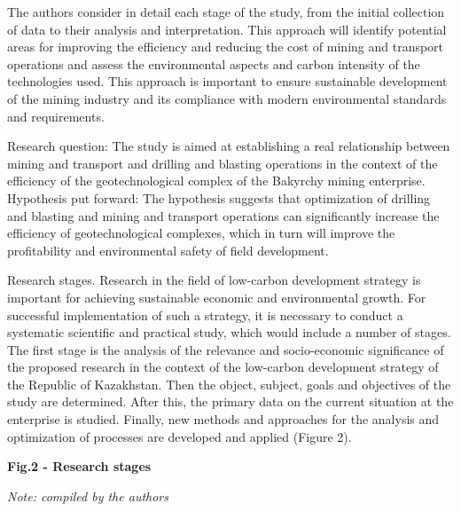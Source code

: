 \begin{multicols}{2}
The authors consider in detail each stage of the study, from the initial
collection of data to their analysis and interpretation. This approach
will identify potential areas for improving the efficiency and reducing
the cost of mining and transport operations and assess the environmental
aspects and carbon intensity of the technologies used. This approach is
important to ensure sustainable development of the mining industry and
its compliance with modern environmental standards and requirements.

Research question: The study is aimed at establishing a real
relationship between mining and transport and drilling and blasting
operations in the context of the efficiency of the geotechnological
complex of the Bakyrchy mining enterprise. Hypothesis put forward: The
hypothesis suggests that optimization of drilling and blasting and
mining and transport operations can significantly increase the
efficiency of geotechnological complexes, which in turn will improve the
profitability and environmental safety of field development.

Research stages. Research in the field of low-carbon development
strategy is important for achieving sustainable economic and
environmental growth. For successful implementation of such a strategy,
it is necessary to conduct a systematic scientific and practical study,
which would include a number of stages. The first stage is the analysis
of the relevance and socio-economic significance of the proposed
research in the context of the low-carbon development strategy of the
Republic of Kazakhstan. Then the object, subject, goals and objectives
of the study are determined. After this, the primary data on the current
situation at the enterprise is studied. Finally, new methods and
approaches for the analysis and optimization of processes are developed
and applied (Figure 2).
\end{multicols}

{\bfseries Fig.2 - Research stages}

\emph{Note: compiled by the authors}

